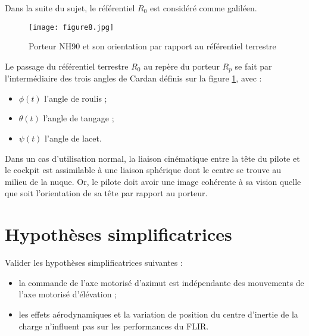 Dans la suite du sujet, le référentiel \textbf{$R_0$} est considéré comme galiléen.

\begin{figure}[!htb]
\begin{center}
\texttt{[image: figure8.jpg]}
\caption{Porteur NH90 et son orientation par rapport au référentiel terrestre \label{figure8}}
\end{center}
\end{figure}

Le passage du référentiel terrestre $R_0$ au repère du porteur $R_p$ se fait par l'intermédiaire des trois angles de
Cardan définis sur la figure \ref{figure8}, avec :
\begin{itemize}
\item $\phi(t)$ l'angle de roulis ;
\item $\theta(t)$ l'angle de tangage ;
\item $\psi(t)$ l'angle de lacet.
\end{itemize}


Dans un cas d'utilisation normal, la liaison cinématique entre la tête du pilote et le cockpit est assimilable à une
liaison sphérique dont le centre se trouve au milieu de la nuque. Or, le pilote doit avoir une image cohérente à
sa vision quelle que soit l'orientation de sa tête par rapport au porteur.


\section{Hypothèses simplificatrices}

\begin{obj}
Valider les hypothèses simplificatrices suivantes :
\begin{itemize}
\item la commande de l'axe motorisé d'azimut est indépendante des mouvements de l'axe motorisé
d'élévation ;
\item  les effets aérodynamiques et la variation de position du centre d'inertie de la charge n'influent pas
sur les performances du FLIR.
\end{itemize}

\end{obj}



